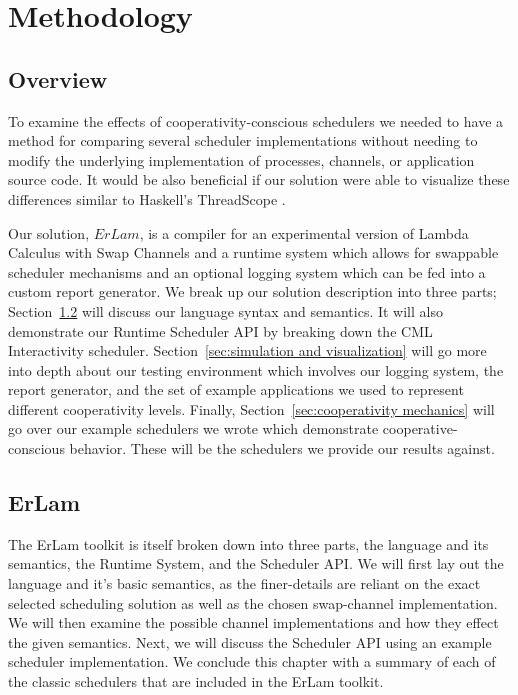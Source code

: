 \chapter{Methodology}
%
\label{chap:methodology}

\section{Overview}\label{sec:method overview}

To examine the effects of cooperativity-conscious schedulers we needed to have 
a method for comparing several scheduler implementations without needing to 
modify the underlying implementation of processes, channels, or application
source code. It would be also beneficial if our solution were able to visualize
these differences similar to Haskell's ThreadScope \cite{jones2009parallel}.

Our solution, $ErLam$, is a compiler for an experimental version of Lambda 
Calculus with Swap Channels and a runtime system which allows for swappable 
scheduler mechanisms and an optional logging system which can be fed into a 
custom report generator.
We break up our solution description into three parts; 
Section~\ref{sec:erlam}
will discuss our language syntax and semantics. It will also demonstrate our
Runtime Scheduler API by breaking down the CML Interactivity scheduler. 
Section~\ref{sec:simulation and visualization} 
will go more into depth about
our testing environment which involves our logging system, the report generator,
and the set of example applications we used to represent different cooperativity
levels. 
Finally, Section~\ref{sec:cooperativity mechanics} will go over our
example schedulers we wrote which demonstrate cooperative-conscious behavior. 
These will be the schedulers we provide our results against.

\section{ErLam}\label{sec:erlam}

The ErLam toolkit is itself broken down into three parts, the language and its
semantics, the Runtime System, and the Scheduler API. We will first lay out the
language and it's basic semantics, as the finer-details are reliant on the exact
selected scheduling solution as well as the chosen swap-channel implementation.
We will then examine the possible channel implementations and how they effect
the given semantics. Next, we will discuss the Scheduler API using an example
scheduler implementation. We conclude this chapter with a summary of each of the 
classic schedulers that are included in the ErLam toolkit.

